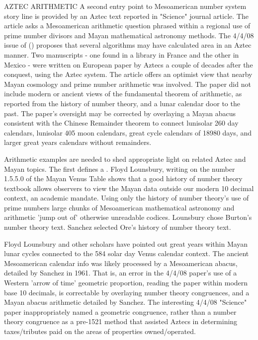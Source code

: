 \documentclass[12pt]{article}
\begin{document}
{AZTEC ARITHMETIC A second entry point to Mesoamerican number system story line is provided by an Aztec text reported in "Science" journal article. The article asks a Mesoamerican arithmetic question phrased within a regional use of prime number divisors and Mayan mathematical astronomy methods. The 4/4/08 issue of () proposes that several algorithms may have calculated area in an Aztec manner. Two manuscripts - one found in a library in France and the other in Mexico - were written on European paper by Aztecs a couple of decades after the conquest, using the Aztec system. The article offers an optimist view that nearby Mayan cosmology and prime number arithmetic was involved. The paper did not include modern or ancient views of the fundamental theorem of arithmetic, as reported from the history of number theory, and a lunar calendar door to the past. The paper's oversight may be corrected by overlaying a Mayan abacus consistent with the Chinese Remainder theorem to connect lunisolar 260 day calendars, lunisolar 405 moon calendars, great cycle calendars of 18980 days, and larger great years calendars without remainders.

Arithmetic examples are needed to shed appropriate light on related Aztec and Mayan topics. The first defines a . Floyd Lounsbury, writing on the number 1.5.5.0 of the Mayan Venus Table shows that a good history of number theory textbook allows observers to view the Mayan data outside our modern 10 decimal context, an academic mandate. Using only the history of number theory's use of prime numbers large chunks of Mesoamerican mathematical astronomy and arithmetic 'jump out of' otherwise unreadable codices. Lounsbury chose Burton's number theory text. Sanchez selected Ore's history of number theory text.

Floyd Lounsbury and other scholars have pointed out great years within Mayan lunar cycles connected to the 584 solar day Venus calendar context. The ancient Mesoamerican calendar info was likely processed by a Mesoamerican abacus, detailed by Sanchez in 1961. That is, an error in the 4/4/08 paper's use of a Western 'arrow of time' geometric proportion, reading the paper within modern base 10 decimals, is correctable by overlaying number theory congruences, and a Mayan abacus arithmetic detailed by Sanchez. The interesting 4/4/08 "Science" paper inappropriately named a geometric congruence, rather than a number theory congruence as a pre-1521 method that assisted Aztecs in determining taxes/tributes paid on the areas of properties owned/operated.

}
\end{document}
